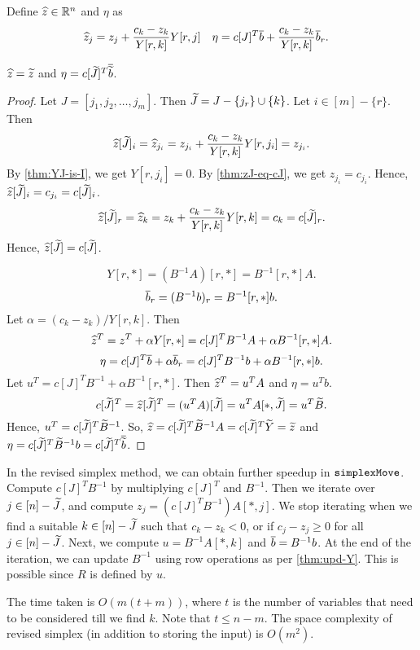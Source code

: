 Define $\widehat{z} \in \mathbb{R}^n$ and $\eta$ as
\begin{align*}
\widehat{z}_j &= z_j + \frac{c_k - z_k}{Y[r,k]} Y[r,j]
& \eta &= c[J]^T\overline{b} + \frac{c_k - z_k}{Y[r, k]}\overline{b}_r.
\end{align*}

\begin{lemma}
\label{thm:upd-z}
$\widehat{z} = \widetilde{z}$ and $\eta = c[\widetilde{J}]^T\overline{\widetilde{b}}$.
\end{lemma}
\begin{proof}
Let $J = [j_1, j_2, \ldots, j_m]$. Then $\widetilde{J} = J - \{j_r\} \cup \{k\}$.
Let $i \in [m] - \{r\}$. Then
\[ \widehat{z}[\widetilde{J}]_i = \widehat{z}_{j_i} = z_{j_i} + \frac{c_k - z_k}{Y[r,k]} Y[r,j_i] = z_{j_i}. \]
By \cref{thm:YJ-is-I}, we get $Y[r,j_i] = 0$.
By \cref{thm:zJ-eq-cJ}, we get $z_{j_i} = c_{j_i}$.
Hence, $\widehat{z}[\widetilde{J}]_i = c_{j_i} = c[\widetilde{J}]_i$.
\[ \widehat{z}[\widetilde{J}]_r = \widehat{z}_k = z_k + \frac{c_k - z_k}{Y[r,k]} Y[r,k] = c_k = c[\widetilde{J}]_r. \]
Hence, $\widehat{z}[\widetilde{J}] = c[\widetilde{J}]$.

\[ Y[r,*] = (B^{-1}A)[r,*] = B^{-1}[r,*]A. \]
\[ \overline{b}_r = (B^{-1}b)_r = B^{-1}[r,*]b. \]
Let $\alpha = (c_k - z_k)/Y[r,k]$. Then
\[ \widehat{z}^T = z^T + \alpha Y[r,*] = c[J]^TB^{-1}A + \alpha B^{-1}[r,*]A. \]
\[ \eta = c[J]^T\overline{b} + \alpha \overline{b}_r = c[J]^TB^{-1}b + \alpha B^{-1}[r,*]b. \]
Let $u^T = c[J]^TB^{-1} + \alpha B^{-1}[r,*]$. Then $\widehat{z}^T = u^TA$ and $\eta = u^Tb$.
\[ c[\widetilde{J}]^T = \widehat{z}[\widetilde{J}]^T = (u^TA)[\widetilde{J}] = u^TA[*,\widetilde{J}] = u^T\widetilde{B}. \]
Hence, $u^T = c[\widetilde{J}]^T\widetilde{B}^{-1}$.
So, $\widehat{z} = c[\widetilde{J}]^T\widetilde{B}^{-1}A = c[\widetilde{J}]^T\widetilde{Y} = \widetilde{z}$
and $\eta = c[\widetilde{J}]^T\widetilde{B}^{-1}b = c[\widetilde{J}]^T\overline{\widetilde{b}}$.
\end{proof}

In the revised simplex method, we can obtain further speedup in $\operatorname{\mathtt{simplexMove}}$.
Compute $c[J]^TB^{-1}$ by multiplying $c[J]^T$ and $B^{-1}$.
Then we iterate over $j \in [n] - \widetilde{J}$, and compute $z_j = (c[J]^TB^{-1})A[*,j]$.
We stop iterating when we find a suitable $k \in [n] - \widetilde{J}$ such that $c_k - z_k < 0$,
or if $c_j - z_j \ge 0$ for all $j \in [n] - \widetilde{J}$.
Next, we compute $u = B^{-1}A[*,k]$ and $\overline{b} = B^{-1}b$.
At the end of the iteration, we can update $B^{-1}$ using row operations as per \cref{thm:upd-Y}.
This is possible since $R$ is defined by $u$.

The time taken is $O(m(t+m))$, where $t$ is the number of variables
that need to be considered till we find $k$. Note that $t \le n-m$.
The space complexity of revised simplex (in addition to storing the input) is $O(m^2)$.


